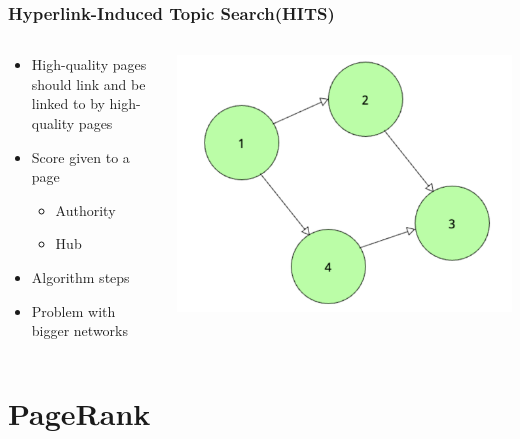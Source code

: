 \documentclass{beamer}
\begin{document}
\begin{frame}[fragile=singleslide]\frametitle{Hyperlink-Induced Topic Search(HITS)}
\begin{columns}
    \begin{column}{0.6\textwidth}\begin{itemize}
    \item High-quality pages should link and be linked to by high-quality pages
    \item Score given to a page
    \begin{itemize}
        \item Authority
        \item Hub
    \end{itemize}
    \item Algorithm steps
    \item Problem with bigger networks
\end{itemize}
    \end{column}
    \begin{column}{0.4\textwidth}
      \includegraphics[width=\textwidth]{explanation_HITS.png}
    \end{column}
  \end{columns}
\end{frame}

\section{PageRank}
\end{document}

